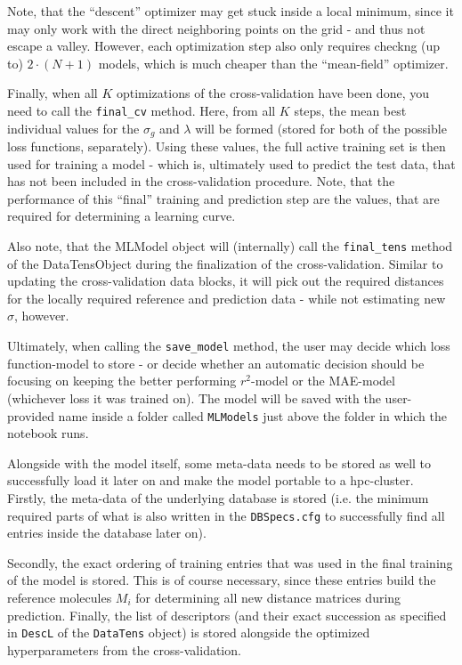 \documentclass[12pt]{achemso}
\begin{document}
\noindent Note, that the ``descent'' optimizer may get stuck inside a local minimum, since it may only work with the direct neighboring points on the grid - and thus not escape a valley. However, each optimization step also only requires checkng (up to) $2 \cdot (N+1)$ models, which is much cheaper than the ``mean-field'' optimizer.

\noindent Finally, when all $K$ optimizations of the cross-validation have been done, you need to call the \texttt{final\_cv} method. Here, from all $K$ steps, the mean best individual values for the $\sigma_g$ and $\lambda$ will be formed (stored for both of the possible loss functions, separately). Using these values, the full active training set is then used for training a model - which is, ultimately used to predict the test data, that has not been included in the cross-validation procedure. Note, that the performance of this ``final'' training and prediction step are the values, that are required for determining a learning curve.

\noindent Also note, that the MLModel object will (internally) call the \texttt{final\_tens} method of the DataTensObject during the finalization of the cross-validation. Similar to updating the cross-validation data blocks, it will pick out the required distances for the locally required reference and prediction data - while not estimating new $\sigma$, however.

\noindent Ultimately, when calling the \texttt{save\_model} method, the user may decide which loss function-model to store - or decide whether an automatic decision should be focusing on keeping the better performing $r^2$-model or the MAE-model (whichever loss it was trained on). The model will be saved with the user-provided name inside a folder called \verb+MLModels+ just above the folder in which the notebook runs.

\noindent Alongside with the model itself, some meta-data needs to be stored as well to successfully load it later on and make the model portable to a hpc-cluster. Firstly, the meta-data of the underlying database is stored (i.e. the minimum required parts of what is also written in the \verb+DBSpecs.cfg+ to successfully find all entries inside the database later on).

\noindent Secondly, the exact ordering of training entries that was used in the final training of the model is stored. This is of course necessary, since these entries build the reference molecules $M_i$ for determining all new distance matrices during prediction. Finally, the list of descriptors (and their exact succession as specified in \texttt{DescL} of the \texttt{DataTens} object) is stored alongside the optimized hyperparameters from the cross-validation.
\end{document}
